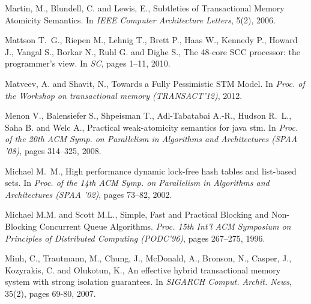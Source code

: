\begin{thebibliography}{99}
{%


 Martin, M.,  Blundell, C. and Lewis, E.,
 Subtleties of Transactional Memory Atomicity Semantics. 
In {\it IEEE Computer Architecture  Letters},  5(2), 2006.



Mattson T.~G., Riepen M., Lehnig T., Brett P., Haas W., Kennedy P., Howard J.,
  Vangal S., Borkar N., Ruhl G. and Dighe S.,
\newblock The 48-core {SCC} processor: the programmer's view.
\newblock In {\em SC}, pages 1--11, 2010.


Matveev, A. and  Shavit, N.,
Towards a Fully Pessimistic STM Model. 
In {\it Proc. of the Workshop on transactional memory (TRANSACT'12)}, 2012.


Menon V., Balensiefer S., Shpeisman T., Adl-Tabatabai A.-R., Hudson R.~L., Saha B. and Welc A.,
\newblock Practical weak-atomicity semantics for java stm.
\newblock In {\em Proc. of the 20th ACM Symp. on Parallelism in Algorithms and
  Architectures (SPAA '08)}, pages 314--325, 2008.



Michael M.~M.,
\newblock High performance dynamic lock-free hash tables and list-based sets.
\newblock In {\em Proc. of the 14th ACM Symp. on Parallelism in Algorithms and
  Architectures (SPAA '02)}, pages 73--82, 2002.





Michael M.M.  and Scott M.L., 
Simple, Fast and Practical Blocking and Non-Blocking Concurrent
Queue Algorithms.
{\it  Proc. 15th  Int'l  ACM Symposium on Principles of  Distributed 
Computing (PODC'96)},  pages 267--275,  1996. 



Minh, C., Trautmann, M., Chung, J., McDonald, A., Bronson, N., Casper, J., Kozyrakis, C. and Olukotun, K.,
An effective hybrid transactional memory system with strong isolation guarantees.
In {\it SIGARCH Comput. Archit. News}, 35(2), pages 69-80, 2007.





}
\end{thebibliography}
